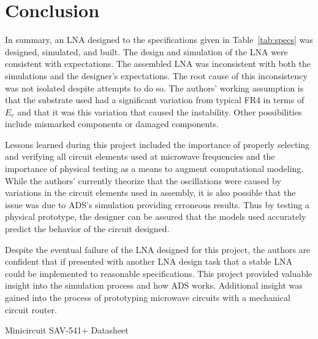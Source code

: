 \documentclass[conference]{IEEEtran}
\begin{document}
\section{Conclusion}
In summary, an LNA designed to the specifications given in Table~\ref{tab:specs} was designed, simulated, and built. The design and simulation of the LNA were consistent with expectations. The assembled LNA was inconsistent with both the simulations and the designer's expectations. The root cause of this inconsistency was not isolated despite attempts to do so. The authors' working assumption is that the substrate used had a significant variation from typical FR4 in terms of $E_r$ and that it was this variation that caused the instability. Other possibilities include mismarked components or damaged components. 

Lessons learned during this project included the importance of properly selecting and verifying all circuit elements used at microwave frequencies and the importance of physical testing as a means to augment computational modeling. While the authors' currently theorize that the oscillations were caused by variations in the circuit elements used in assembly, it is also possible that the issue was due to ADS's simulation providing erroneous results. Thus by testing a physical prototype, the designer can be assured that the models used accurately predict the behavior of the circuit designed.

Despite the eventual failure of the LNA designed for this project, the authors are confident that if presented with another LNA design task that a stable LNA could be implemented to reasonable specifications. This project provided valuable insight into the simulation process and how ADS works. Additional insight was gained into the process of prototyping microwave circuits with a mechanical circuit router.
\begin{thebibliography}{1}
Minicircuit SAV-541+ Datasheet
\end{thebibliography}
\end{document}
